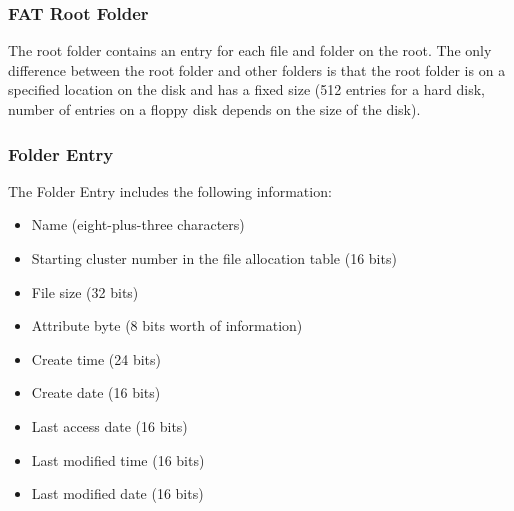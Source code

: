 % 
% 
% 
\begin{frame}[fragile]
    \frametitle{FAT Root Folder}
    The root folder contains an entry for each file and folder on the root. The only difference between the root folder and other folders is that {\color{red}the root folder is on a specified location} on the disk and {\color{red}has a fixed size} (512 entries for a hard disk, number of entries on a floppy disk depends on the size of the disk).

\end{frame}
% 
% 
\begin{frame}[fragile]
    \frametitle{Folder Entry}
    The Folder Entry includes the following information:

    \begin{itemize}
        \item Name (eight-plus-three characters)
        \item Starting cluster number in the file allocation table (16 bits)
        \item File size (32 bits) \pause
        \item Attribute byte (8 bits worth of information) \pause
        \item Create time (24 bits)
        \item Create date (16 bits)
        \item Last access date (16 bits)
        \item Last modified time (16 bits)
        \item Last modified date (16 bits)
    \end{itemize}
\end{frame}
